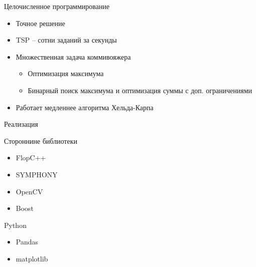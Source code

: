 \documentclass{beamer}
\begin{document}
% 
\begin{frame}{Целочисленное программирование}
\begin{itemize}
\item Точное решение
\item TSP -- сотни заданий за секунды
\item Множественная задача коммивояжера
    \begin{itemize}
    \item Оптимизация максимума
    \item Бинарный поиск максимума и оптимизация суммы с доп. ограничениями
    \end{itemize}

\item Работает медленнее алгоритма Хельда-Карпа
\end{itemize}
\end{frame}

\begin{frame}{Реализация}

Стороннине библиотеки
\begin{itemize}
\item FlopC++
\item SYMPHONY
\item OpenCV
\item Boost
\end{itemize}

Python
\begin{itemize}
\item Pandas
\item matplotlib
\end{itemize}

\end{frame}
\end{document}

